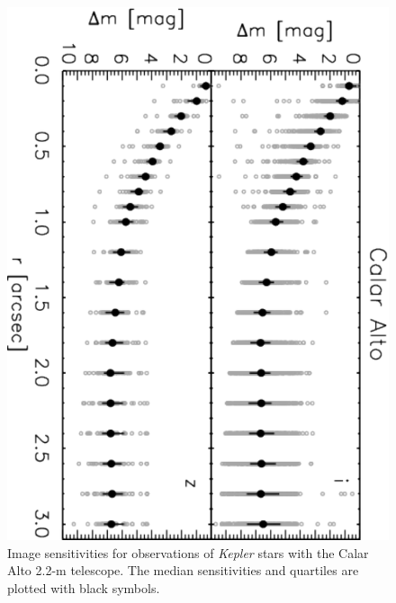 \documentclass[twocolumn,appendixfloats]{aastex6}
\begin{document}
\begin{figure}[!t]
\centering
\includegraphics[angle=90, scale=0.47]{CalarAlto_images_sensitivities.pdf}
\caption{Image sensitivities for observations of {\it Kepler} stars with the 
Calar Alto 2.2-m telescope. The median sensitivities and quartiles 
are plotted with black symbols.
\label{Sensitivites_CalarAlto}}
\end{figure}
\end{document}
